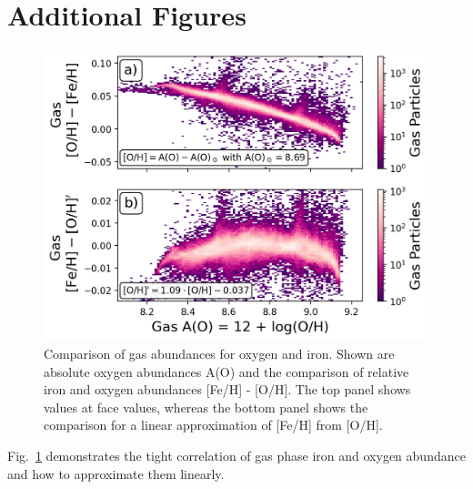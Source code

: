 \documentclass[twocolumn,apj,numberedappendix,appendixfloats,twocolappendix]{openjournal}
\begin{document}


\appendix

\section{Additional Figures}

\begin{figure}
    \centering
    \includegraphics[width=0.9\columnwidth]{figures/fe_h_vs_a_o_gas}
    \caption{Comparison of gas abundances for oxygen and iron. Shown are absolute oxygen abundances A(O) and the comparison of relative iron and oxygen abundances [Fe/H] - [O/H]. The top panel shows values at face values, whereas the bottom panel shows the comparison for a linear approximation of [Fe/H] from [O/H].}    \label{fig:fe_h_vs_a_o_gas}
\end{figure}

Fig.~\ref{fig:fe_h_vs_a_o_gas} demonstrates the tight correlation of gas phase iron and oxygen abundance and how to approximate them linearly.

\vspace{-4cm}
\end{document}

